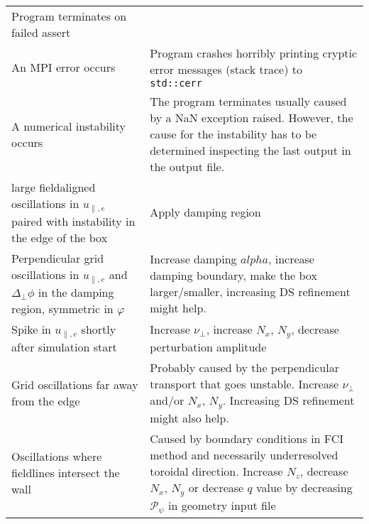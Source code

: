 \begin{longtable}{p{6cm}p{8cm}}
Program terminates on failed assert
    \\
An MPI error occurs
&
Program crashes horribly printing cryptic error messages (stack trace) to \texttt{std::cerr}
    \\
A numerical instability occurs
&
The program terminates usually caused by a NaN exception raised. However,
the cause for the instability has to be determined inspecting the
last output in the output file.
    \\
\qquad large fieldaligned oscillations in $u_{\parallel,e}$ paired with instability in the edge of the box
&
Apply damping region
    \\
\qquad Perpendicular grid oscillations in $u_{\parallel,e}$ and $\Delta_\perp \phi$ in the damping region, symmetric in $\varphi$
&
Increase damping $alpha$, increase damping boundary, make the box larger/smaller, increasing DS refinement might help.
    \\
\qquad Spike in $u_{\parallel,e}$ shortly after simulation start
&
Increase $\nu_\perp$, increase $N_x$, $N_y$, decrease perturbation amplitude
    \\
\qquad Grid oscillations far away from the edge
&
Probably caused by the perpendicular transport that goes unstable. Increase $\nu_\perp$ and/or $N_x$, $N_y$. Increasing DS refinement might also help.
\\
\qquad Oscillations where fieldlines intersect the wall
&
Caused by boundary conditions in FCI method and necessarily underresolved toroidal direction.
Increase $N_z$, decrease $N_x$, $N_y$ or decrease $q$ value by decreasing $\mathcal P_\psi$ in geometry input file
\\
\bottomrule
\end{longtable}





